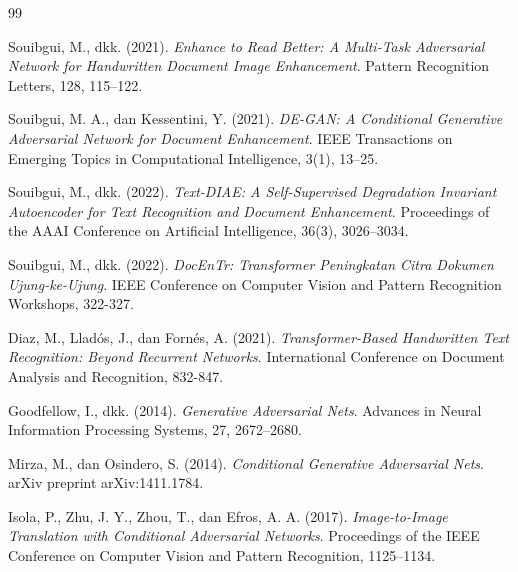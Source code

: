 \documentclass[12pt,a4paper]{book}
\begin{document}
\begin{thebibliography}{99}
\setlength{\itemsep}{0.2cm}


Souibgui, M., dkk. (2021).
\textit{Enhance to Read Better: A Multi-Task Adversarial Network for Handwritten Document Image Enhancement}.
Pattern Recognition Letters, 128, 115--122.

Souibgui, M. A., dan Kessentini, Y. (2021).
\textit{DE-GAN: A Conditional Generative Adversarial Network for Document Enhancement}.
IEEE Transactions on Emerging Topics in Computational Intelligence, 3(1), 13--25.

Souibgui, M., dkk. (2022).
\textit{Text-DIAE: A Self-Supervised Degradation Invariant Autoencoder for Text Recognition and Document Enhancement}.
Proceedings of the AAAI Conference on Artificial Intelligence, 36(3), 3026--3034.

Souibgui, M., dkk. (2022).
\textit{DocEnTr: Transformer Peningkatan Citra Dokumen Ujung-ke-Ujung}.
IEEE Conference on Computer Vision and Pattern Recognition Workshops, 322-327.

Diaz, M., Lladós, J., dan Fornés, A. (2021).
\textit{Transformer-Based Handwritten Text Recognition: Beyond Recurrent Networks}.
International Conference on Document Analysis and Recognition, 832-847.


Goodfellow, I., dkk. (2014).
\textit{Generative Adversarial Nets}.
Advances in Neural Information Processing Systems, 27, 2672--2680.

Mirza, M., dan Osindero, S. (2014).
\textit{Conditional Generative Adversarial Nets}.
arXiv preprint arXiv:1411.1784.

Isola, P., Zhu, J. Y., Zhou, T., dan Efros, A. A. (2017).
\textit{Image-to-Image Translation with Conditional Adversarial Networks}.
Proceedings of the IEEE Conference on Computer Vision and Pattern Recognition, 1125--1134.



\end{thebibliography}
\end{document}
